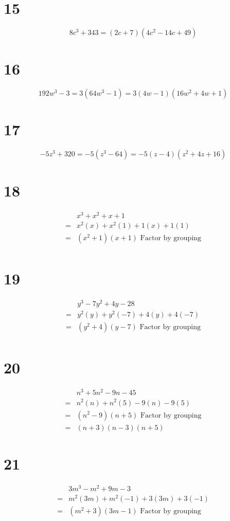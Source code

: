\documentclass{article}
\theoremstyle{definition}
\begin{document}
\section*{15}
\[ 8c^3+343=(2c+7)(4c^2-14c+49) \]

\section*{16}
\[ 192w^3-3=3(64w^3-1)=3(4w-1)(16w^2+4w+1) \]

\section*{17}
\[ -5z^3+320=-5(z^3-64)=-5(z-4)(z^2+4z+16) \]

\section*{18}
\[
\begin{array}{rl}
	& x^3+x^2+x+1 \\
=	& x^2(x)+x^2(1)+1(x)+1(1) \\
=	& (x^2+1)(x+1)\textrm{ Factor by grouping} \\
\end{array}
\]

\section*{19}
\[
\begin{array}{rl}
	& y^3-7y^2+4y-28 \\
=	& y^2(y)+y^2(-7)+4(y)+4(-7) \\
=	& (y^2+4)(y-7)\textrm{ Factor by grouping} \\
\end{array}
\]

\section*{20}
\[
\begin{array}{rl}
	& n^3+5n^2-9n-45 \\
=	& n^2(n)+n^2(5)-9(n)-9(5) \\
=	& (n^2-9)(n+5)\textrm{ Factor by grouping} \\
=	& (n+3)(n-3)(n+5)
\end{array}
\]

\section*{21}
\[
\begin{array}{rl}
	& 3m^3-m^2+9m-3 \\
=	& m^2(3m)+m^2(-1)+3(3m)+3(-1) \\
=	& (m^2+3)(3m-1)\textrm{ Factor by grouping} \\
\end{array}
\]
\end{document}
